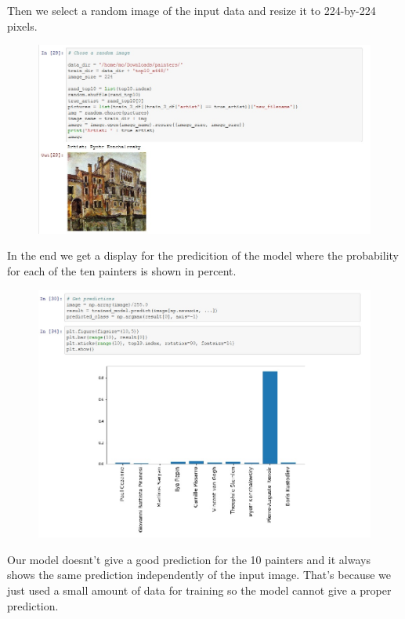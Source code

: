 \documentclass[
	12pt, %
]{fphw}
\begin{document}
\noindent  Then we select a random image of the input data and resize it to 224-by-224 pixels. \\
\begin{figure}[H]
	\includegraphics[width=1\textwidth]{Check2.jpg}
\end{figure}

\noindent In the end we get a display for the predicition of the model where the probability for each of the ten painters is shown in percent.\\
\begin{figure}[H]
	\includegraphics[width=1\textwidth]{Check3.jpg}
\end{figure}

\noindent Our model doesnt't give a good prediction for the 10 painters and it always shows the same prediction independently of the input image. That's because we just used a small amount of data for training so the model cannot give a proper prediction. 
 
\end{document}
